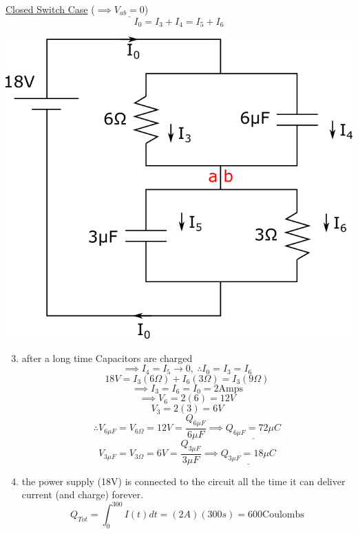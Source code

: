 \pagebreak
\underline{Closed Switch Case} ($\implies \underline{V_{ab}=0}$) 
$$I_0=I_3+I_4=I_5+I_6$$
\vspace{5mm}

\hspace{5mm}\includegraphics[width=0.4\linewidth]{Images/P7img3.png}

\begin{enumerate}
    \setcounter{enumi}{2}
    \item after a long time Capacitors are charged
        $$\implies I_4=I_5 \rightarrow 0,\: \therefore I_0=I_3=I_6$$
        $$18V=I_3(6\Omega)+I_6(3\Omega)=I_3(9\Omega)$$
        $$\implies I_3=I_6=I_0=2\textrm{Amps}$$
        $$\implies V_6=2(6)=12V$$
        $$V_3=2(3)=6V$$
        $$\therefore V_{6\mu F}=V_{6\Omega}=12V=\frac{Q_{6\mu F}}{6\mu F} \implies \underline{Q_{6\mu F} = 72\mu C}$$
        $$V_{3\mu F}=V_{3\Omega}=6V=\frac{Q_{3\mu F}}{3\mu F} \implies \underline{Q_{3\mu F} = 18\mu C}$$

    \item the power supply (18V) is connected to the circuit all the time it can deliver current (and charge) forever.
        $$Q_{Tot}=\int_0^{300}I(t)dt=(2A)(300s)=600\textrm{Coulombs}$$
\end{enumerate}